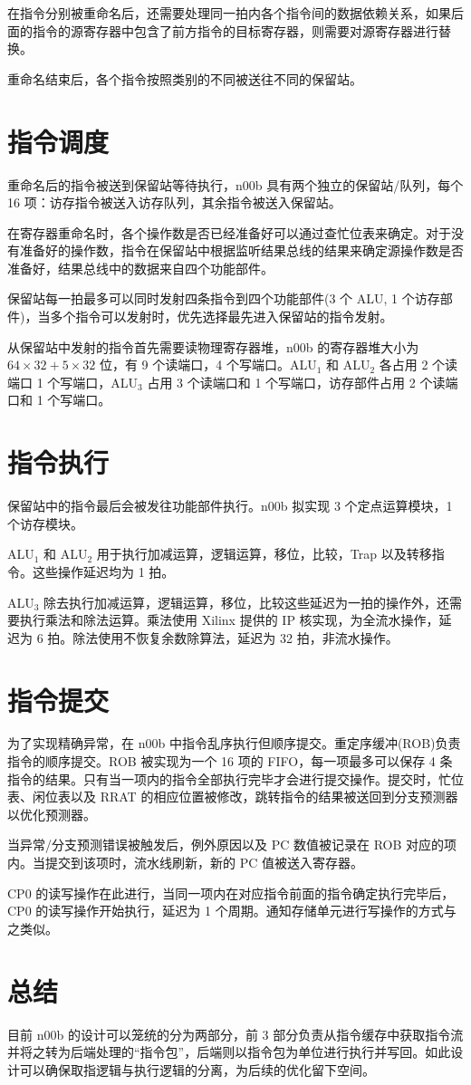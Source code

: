 \documentclass[blue,normal,cn]{elegantnote}
\begin{document}
在指令分别被重命名后，还需要处理同一拍内各个指令间的数据依赖关系，如果后面的指令的源寄存器中包含了前方指令的目标寄存器，则需要对源寄存器进行替换。

重命名结束后，各个指令按照类别的不同被送往不同的保留站。

\section{指令调度}

重命名后的指令被送到保留站等待执行，n00b 具有两个独立的保留站/队列，每个 16 项：访存指令被送入访存队列，其余指令被送入保留站。

在寄存器重命名时，各个操作数是否已经准备好可以通过查忙位表来确定。对于没有准备好的操作数，指令在保留站中根据监听结果总线的结果来确定源操作数是否准备好，结果总线中的数据来自四个功能部件。

保留站每一拍最多可以同时发射四条指令到四个功能部件(3 个 ALU, 1 个访存部件)，当多个指令可以发射时，优先选择最先进入保留站的指令发射。

从保留站中发射的指令首先需要读物理寄存器堆，n00b 的寄存器堆大小为 $64 \times 32 + 5 \times 32$ 位，有 9 个读端口，4 个写端口。ALU$_1$ 和 ALU$_2$ 各占用 2 个读端口 1 个写端口，ALU$_3$ 占用 3 个读端口和 1 个写端口，访存部件占用 2 个读端口和 1 个写端口。

\section{指令执行}

保留站中的指令最后会被发往功能部件执行。n00b 拟实现 3 个定点运算模块，1 个访存模块。

ALU$_1$ 和 ALU$_2$ 用于执行加减运算，逻辑运算，移位，比较，Trap 以及转移指令。这些操作延迟均为 1 拍。

ALU$_3$ 除去执行加减运算，逻辑运算，移位，比较这些延迟为一拍的操作外，还需要执行乘法和除法运算。乘法使用 Xilinx 提供的 IP 核实现，为全流水操作，延迟为 6 拍。除法使用不恢复余数除算法，延迟为 32 拍，非流水操作。

\section{指令提交}
为了实现精确异常，在 n00b 中指令乱序执行但顺序提交。重定序缓冲(ROB)负责指令的顺序提交。ROB 被实现为一个 16 项的 FIFO，每一项最多可以保存 4 条指令的结果。只有当一项内的指令全部执行完毕才会进行提交操作。提交时，忙位表、闲位表以及 RRAT 的相应位置被修改，跳转指令的结果被送回到分支预测器以优化预测器。

当异常/分支预测错误被触发后，例外原因以及 PC 数值被记录在 ROB 对应的项内。当提交到该项时，流水线刷新，新的 PC 值被送入寄存器。

CP0 的读写操作在此进行，当同一项内在对应指令前面的指令确定执行完毕后，CP0 的读写操作开始执行，延迟为 1 个周期。通知存储单元进行写操作的方式与之类似。

\section{总结}
目前 n00b 的设计可以笼统的分为两部分，前 3 部分负责从指令缓存中获取指令流并将之转为后端处理的``指令包''，后端则以指令包为单位进行执行并写回。如此设计可以确保取指逻辑与执行逻辑的分离，为后续的优化留下空间。
\end{document}
